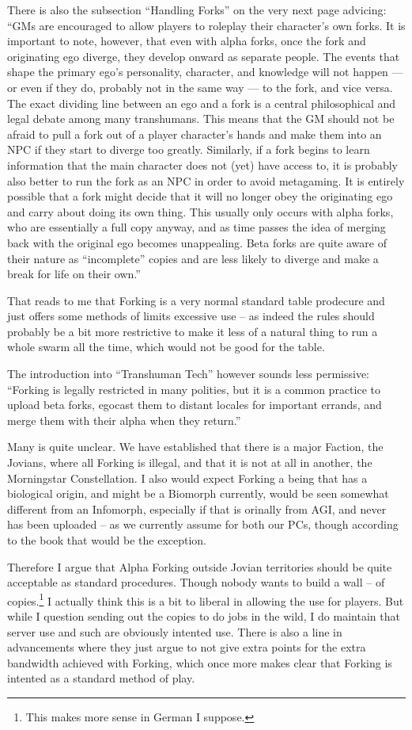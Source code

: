 There is also the subsection “Handling Forks” on the very next page advicing: “GMs are encouraged to allow players to roleplay their character’s own forks. It is important to note, however, that even with alpha forks, once the fork and originating ego diverge, they develop onward as separate people. The events that shape the primary ego’s personality, character, and knowledge will not happen — or even if they do, probably not in the same way — to the fork, and vice versa. The exact dividing line between an ego and a fork is a central philosophical and legal debate among many transhumans. This means that the GM should not be afraid to pull a fork out of a player character’s hands and make them into an NPC if they start to diverge too greatly. Similarly, if a fork begins to learn information that the main character does not (yet) have access to, it is probably also better to run the fork as an NPC in order to avoid metagaming. It is entirely possible that a fork might decide that it will no longer obey the originating ego and carry about doing its own thing. This usually only occurs with alpha forks, who are essentially a full copy anyway, and as time passes the idea of merging back with the original ego becomes unappealing. Beta forks are quite aware of their nature as “incomplete” copies and are less likely to diverge and make a break for life on their own.”

That reads to me that Forking is a very normal standard table prodecure and just offers some methods of limits excessive use -- as indeed the rules should probably be a bit more restrictive to make it less of a natural thing to run a whole swarm all the time, which would not be good for the table.

The introduction into “Transhuman Tech” however sounds less permissive: “Forking is legally restricted in many polities, but it is a common practice to upload beta forks, egocast them to distant locales for important errands, and merge them with their alpha when they return.” \citep[pg. 286]{ep2e_1.1_2019}

Many is quite unclear. We have established that there is a major Faction, the Jovians, where all Forking is illegal, and that it is not at all in another, the Morningstar Constellation. I also would expect Forking a being that has a biological origin, and might be a Biomorph currently, would be seen somewhat different from an Infomorph, especially if that is orinally from AGI, and never has been uploaded -- as we currently assume for both our PCs, though according to the book that would be the exception.

Therefore I argue that Alpha Forking outside Jovian territories should be quite acceptable as standard procedures. Though nobody wants to build a wall -- of copies.\footnote{This makes more sense in German I suppose.} I actually think this is a bit to liberal in allowing the use for players. But while I question sending out the copies to do jobs in the wild, I do maintain that server use and such are obviously intented use. There is also a line in advancements where they just argue to not give extra points for the extra bandwidth achieved with Forking, which once more makes clear that Forking is intented as a standard method of play.